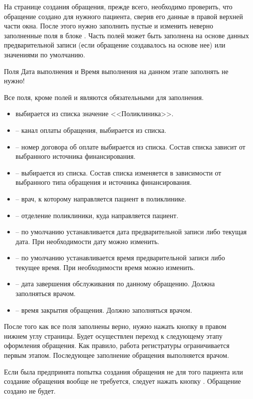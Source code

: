 На странице создания обращения, прежде всего, необходимо проверить, что обращение создано для нужного пациента, сверив его данные в правой верхней части окна. После этого нужно заполнить пустые и изменить неверно заполненные поля в блоке . Часть полей может быть заполнена на основе данных предварительной записи (если обращение создавалось на основе нее) или значениями по умолчанию.

\begin{vnim}
 Поля Дата выполнения и Время выполнения на данном этапе заполнять не нужно!
\end{vnim}

Все поля, кроме полей  и  являются обязательными для заполнения.
\begin{itemize}
 \item {} выбирается из списка значение <<Поликлиника>>.
 \item {} – канал оплаты обращения, выбирается из списка.
 \item {} – номер договора об оплате выбирается из списка. Состав списка зависит от выбранного источника финансирования.
 \item {} – выбирается из списка. Состав списка изменяется в зависимости от выбранного типа обращения и источника финансирования.
 \item {} – врач, к которому направляется пациент в поликлинике.
 \item {} – отделение поликлиники, куда направляется пациент.
 \item {} – по умолчанию устанавливается дата предварительной записи либо текущая дата. При необходимости дату можно изменить.
 \item {} – по умолчанию устанавливается время предварительной записи либо текущее время. При необходимости время можно изменить.
 \item {} – дата завершения обслуживания по данному обращению. Должна заполняться врачом.
 \item {} – время закрытия обращения. Должно заполняться врачом.
\end{itemize}

После того как все поля заполнены верно, нужно нажать кнопку  в правом нижнем углу страницы. Будет осуществлен переход к следующему этапу оформления обращения. Как правило, работа регистратуры ограничивается первым этапом. Последующее заполнение обращения выполняется врачом.

Если была предпринята попытка создания обращения не для того пациента или создание обращения вообще не требуется, следует нажать кнопку . Обращение создано не будет.